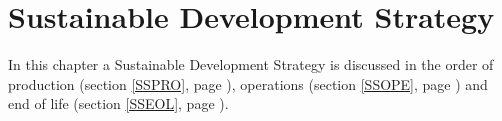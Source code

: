 \chapter{Sustainable Development Strategy}
\label{SS}

In this chapter a Sustainable Development Strategy is discussed in the order of production (section \ref{SSPRO}, page \pageref{SSPRO}), operations (section \ref{SSOPE}, page \pageref{SSOPE}) and end of life (section \ref{SSEOL}, page \pageref{SSEOL}).